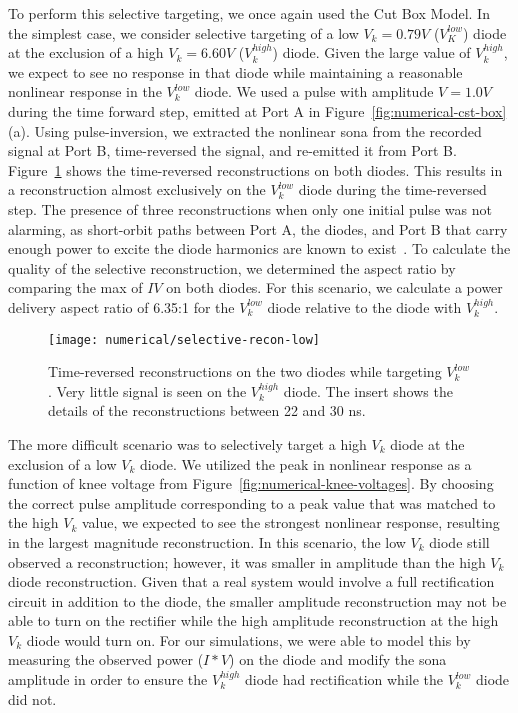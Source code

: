 To perform this selective targeting, we once again used the Cut Box Model. In the simplest case, we consider selective targeting of a low $V_{k} = 0.79V$ ($V_K^{low}$) diode at the exclusion of a high $V_{k} = 6.60V$ ($V_k^{high}$) diode. Given the large value of $V_k^{high}$, we expect to see no response in that diode while maintaining a reasonable nonlinear response in the $V_k^{low}$ diode. We used a pulse with amplitude $V = 1.0 V$ during the time forward step, emitted at Port A in Figure~\ref{fig:numerical-cst-box}(a). Using pulse-inversion, we extracted the nonlinear sona from the recorded signal at Port B, time-reversed the signal, and re-emitted it from Port B. Figure~\ref{fig:numerical-selective-recon-low} shows the time-reversed reconstructions on both diodes. This results in a reconstruction almost exclusively on the $V_k^{low}$ diode during the time-reversed step. The presence of three reconstructions when only one initial pulse was not alarming, as short-orbit paths between Port A, the diodes, and Port B that carry enough power to excite the diode harmonics are known to exist~\cite{hansjurgenstockmann2006}. To calculate the quality of the selective reconstruction, we determined the aspect ratio by comparing the max of $IV$ on both diodes. For this scenario, we calculate a power delivery aspect ratio of 6.35:1 for the $V_k^{low}$ diode relative to the diode with $V_k^{high}$.

\begin{figure}[t]
\centering
\texttt{[image: numerical/selective-recon-low]}
\caption[Selective reconstruction on a $V_{k}^{low}$ diode]{Time-reversed reconstructions on the two diodes while targeting $V_{k}^{low}$. Very little signal is seen on the $V_{k}^{high}$ diode. The insert shows the details of the reconstructions between 22 and 30 ns.}
\label{fig:numerical-selective-recon-low}
\end{figure}

 The more difficult scenario was to selectively target a high $V_k$ diode at the exclusion of a low $V_k$ diode. We utilized the peak in nonlinear response as a function of knee voltage from Figure~\ref{fig:numerical-knee-voltages}. By choosing the correct pulse amplitude corresponding to a peak value that was matched to the high $V_k$ value, we expected to see the strongest nonlinear response, resulting in the largest magnitude reconstruction. In this scenario, the low $V_k$ diode still observed a reconstruction; however, it was smaller in amplitude than the high $V_k$ diode reconstruction. Given that a real system would involve a full rectification circuit in addition to the diode, the smaller amplitude reconstruction may not be able to turn on the rectifier while the high amplitude reconstruction at the high $V_k$ diode would turn on. For our simulations, we were able to model this by measuring the observed power ($I*V$) on the diode and modify the sona amplitude in order to ensure the $V_k^{high}$ diode had rectification while the $V_k^{low}$ diode did not.

